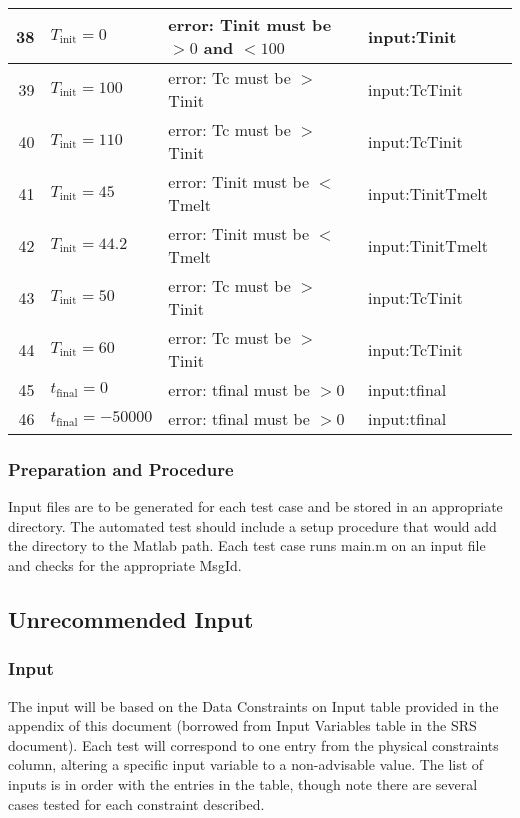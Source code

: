 \documentclass[12pt]{article}
\begin{document}
\begin{center}
\begin{longtable}{ | r | p{4cm} | p{4cm} | p{4cm} | p{4cm} |}
	38 & $T_{\text{init}} = 0$ & error: Tinit must be $> 0$ and $< 100$ &input:Tinit \\ \hline
	39 & $T_{\text{init}} = 100$ & error: Tc must be $>$ Tinit & input:TcTinit \\ \hline
	40 & $T_{\text{init}} = 110$ & error: Tc must be $>$ Tinit & input:TcTinit \\ \hline
	41 & $T_{\text{init}} = 45$ & error: Tinit must be $<$ Tmelt & input:TinitTmelt \\ \hline
	42 & $T_{\text{init}} = 44.2$ & error: Tinit must be $<$ Tmelt & input:TinitTmelt \\ \hline
	43 & $T_{\text{init}} = 50$ &error: Tc must be $>$ Tinit & input:TcTinit \\ \hline
	44 & $T_{\text{init}} = 60$ &error: Tc must be $>$ Tinit & input:TcTinit \\ \hline
	45 & $t_{\text{final}} = 0$ &error: tfinal must be $> 0$ &input:tfinal \\ \hline
	46 & $t_{\text{final}} = -50000$ &error: tfinal must be $> 0$ &input:tfinal \\ \hline
	\end{longtable}
\end{center}

\subsubsection{Preparation and Procedure}
Input files are to be generated for each test case and be stored in an appropriate
 directory. The automated test should include a setup procedure that would add 
 the directory to the Matlab path. Each test case runs main.m on an input file
  and checks for the appropriate MsgId. 

\subsection{Unrecommended Input}

\subsubsection{Input}
The input will be based on the Data Constraints on Input table provided 
in the appendix of this document (borrowed from Input Variables table in the SRS document). Each test will correspond to one entry from 
the physical constraints column, altering a specific input variable to a non-advisable
 value. The list of inputs is in order with the entries in the table, though note there are several cases tested for each constraint described.
 
\end{document}
